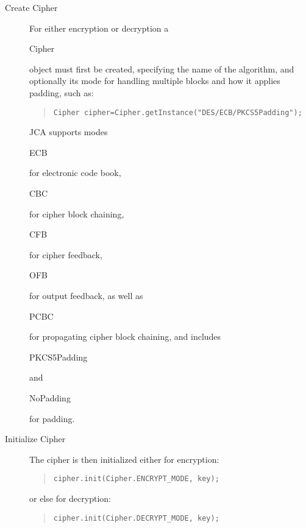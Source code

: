 \begin{description}
  \item[Create Cipher]
  For either encryption or decryption a \begin{code}Cipher\end{code} object must
  first be created, specifying the name of the algorithm, and optionally
  its mode for handling multiple blocks and how it applies padding, such as:
\begin{quote}\begin{code}\begin{verbatim}
Cipher cipher=Cipher.getInstance("DES/ECB/PKCS5Padding");
\end{verbatim}\end{code}\end{quote}
  JCA supports modes \begin{code}ECB\end{code} for electronic code book,
  \begin{code}CBC\end{code} for cipher block chaining,
  \begin{code}CFB\end{code} for cipher feedback,
  \begin{code}OFB\end{code} for output feedback,
  as well as \begin{code}PCBC\end{code} for propagating cipher block chaining,
  and includes \begin{code}PKCS5Padding\end{code} and
  \begin{code}NoPadding\end{code} for padding.

  \item[Initialize Cipher]
  The cipher is then initialized either for encryption:
\begin{quote}\begin{code}\begin{verbatim}
cipher.init(Cipher.ENCRYPT_MODE, key);
\end{verbatim}\end{code}\end{quote}
  or else for decryption:
\begin{quote}\begin{code}\begin{verbatim}
cipher.init(Cipher.DECRYPT_MODE, key);
\end{verbatim}\end{code}\end{quote}


\end{description}
